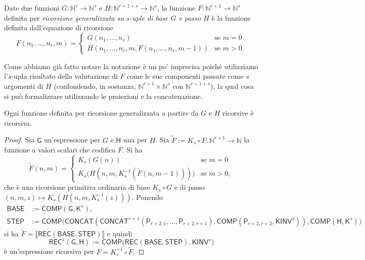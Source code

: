 \begin{defi}
Date due funzioni $G\colon\mathbb N^r\to\mathbb N^s$ e $H\colon\mathbb N^{r+1+s}\to\mathbb N^s$, la funzione $F\colon\mathbb N^{r+1}\to\mathbb N^s$ definita per \emph{ricorsione generalizzata su $s$-uple di base $G$ e passo $H$} è la funzione definita dall'equazione di ricorsione
\[
F(n_1,\dots,n_r,m)=\begin{cases}
G(n_1,\dots,n_r) & \text{se } m=0\\
H(n_1,\dots,n_r,m,F(n_1,\dots,n_r,m-1)) & \text{se } m>0.
\end{cases}
\]
\end{defi}

Come abbiamo già fatto notare la notazione è un po' imprecisa poiché utilizziamo l'$s$-upla risultato della valutazione di $F$ come le sue componenti passate come $s$ argomenti di $H$ (confondendo, in sostanza, $\mathbb N^{r+1}\times\mathbb N^s$ con $\mathbb N^{r+1+s}$), la qual cosa si può formalizzare utilizzando le proiezioni e la concatenazione.

\begin{prop}
Ogni funzione definita per ricorsione generalizzata a partire da $G$ e $H$ ricorsive è ricorsiva.
\end{prop}

\begin{proof}
Sia $\mathsf G$ un'espressione per $G$ e $\mathsf H$ una per $H$. Sia $\tilde F:=K_s\circ F\colon\mathbb N^{r+1}\to\mathbb N$ la funzione a valori scalari che codifica $F$. Si ha
\[
\tilde F(n,m)=\begin{cases}
K_s(G(n)) & \text{se } m=0\\
K_s\bigl(H(n,m,K_s^{-1}(\tilde F(n,m-1)))\bigr) & \text{se } m>0,
\end{cases}
\]
che è una ricorsione primitiva ordinaria di base $K_s\circ G$ e di passo $(n,m,z)\mapsto K_s(H(n,m,K_s^{-1}(z)))$. Ponendo
\begin{align*}
\mathsf{BASE}&:=\mathsf{COMP}(\mathsf G,\mathsf K^s),\\
\mathsf{STEP}&:=\mathsf{COMP}\bigl(\mathsf{CONCAT}(\mathsf{CONCAT}^{r+1}(\mathsf P_{r+2,1},\dots,\mathsf P_{r+2,r+1}),\mathsf{COMP}(\mathsf P_{r+2,r+2},\mathsf{KINV}^s)),\mathsf{COMP}(\mathsf H,\mathsf K^s)\bigr)
\end{align*}
si ha $\tilde F=\llbracket\mathsf{REC}(\mathsf{BASE},\mathsf{STEP})\rrbracket$ e quindi
\[
\mathsf{REC}^s(\mathsf G,\mathsf H):=\mathsf{COMP}\bigl(\mathsf{REC}(\mathsf{BASE},\mathsf{STEP}),\mathsf{KINV}^s\bigr)
\]
è un'espressione ricorsiva per $F=K_s^{-1}\circ\tilde F$.
\end{proof}


